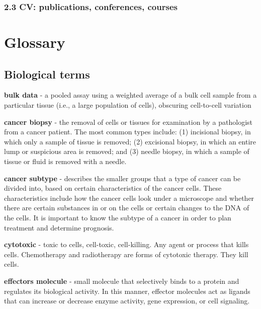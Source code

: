 \documentclass[12pt,]{book}
\theoremstyle{definition}
\theoremstyle{definition}
\theoremstyle{definition}
\theoremstyle{remark}
\begin{document}
\hypertarget{cv-publications-conferences-courses}{%
\subsection*{2.3 CV: publications, conferences,
courses}\label{cv-publications-conferences-courses}}



\newpage

\hypertarget{glossary}{%
\chapter*{Glossary}\label{glossary}}

\hypertarget{biological-terms}{%
\section*{Biological terms}\label{biological-terms}}

\textbf{bulk data} - a pooled assay using a weighted average of a bulk
cell sample from a particular tissue (i.e., a large population of
cells), obscuring cell-to-cell variation

\textbf{cancer biopsy} - the removal of cells or tissues for examination
by a pathologist from a cancer patient. The most common types include:
(1) incisional biopsy, in which only a sample of tissue is removed; (2)
excisional biopsy, in which an entire lump or suspicious area is
removed; and (3) needle biopsy, in which a sample of tissue or fluid is
removed with a needle. \citep{biopsy}

\textbf{cancer subtype} - describes the smaller groups that a type of
cancer can be divided into, based on certain characteristics of the
cancer cells. These characteristics include how the cancer cells look
under a microscope and whether there are certain substances in or on the
cells or certain changes to the DNA of the cells. It is important to
know the subtype of a cancer in order to plan treatment and determine
prognosis. \citep{cansub}

\textbf{cytotoxic} - toxic to cells, cell-toxic, cell-killing. Any agent
or process that kills cells. Chemotherapy and radiotherapy are forms of
cytotoxic therapy. They kill cells. \citep{cytotoxic}

\textbf{effectors molecule} - small molecule that selectively binds to a
protein and regulates its biological activity. In this manner, effector
molecules act as ligands that can increase or decrease enzyme activity,
gene expression, or cell signaling. \citep{Cambronne2006}
\end{document}
